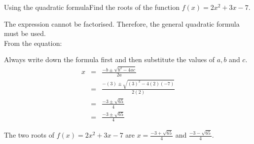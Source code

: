\begin{wex}{Using the quadratic formula}{Find the roots of the function $f(x) = 2x^{2} + 3x - 7$.\\}{
The expression cannot be factorised. Therefore, the general quadratic formula must be used.\\

From the equation:

Always write down the formula first and then substitute the values of $a, b$ and $c$.
\begin{eqnarray}
x & =& \frac{-b \pm \sqrt{b^{2} - 4ac}}{2a} \\
& =& \frac{-(3) \pm \sqrt{(3)^{2} -4(2)(-7)}}{2(2)} \\
& =& \frac{-3 \pm \sqrt{65}}{4} \\
& =& \frac{-3 \pm \sqrt{65}}{4}
\end{eqnarray}

The two roots of $f(x) = 2x^{2} + 3x - 7$ are $x = \frac{-3 + \sqrt{65}}{4}$ and $\frac{-3 - \sqrt{65}}{4}$.}
\end{wex}

